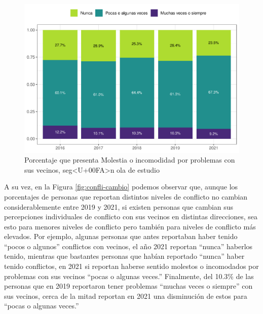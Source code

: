\documentclass[
  12pt,
]{book}
\begin{document}
\begin{figure}

{\centering \includegraphics{reporte-elsoc_files/figure-latex/confli-olas-1} 

}

\caption{Porcentaje que presenta Molestia o incomodidad por problemas con sus vecinos, seg<U+00FA>n ola de estudio }\label{fig:confli-olas}
\end{figure}

A su vez, en la Figura \ref{fig:confli-cambio} podemos observar que, aunque los porcentajes de personas que reportan distintos niveles de conflicto no cambian considerablemente entre 2019 y 2021, si existen personas que cambian sus percepciones individuales de conflicto con sus vecinos en distintas direcciones, sea esto para menores niveles de conflicto pero también para niveles de conflicto más elevados. Por ejemplo, algunas personas que antes reportaban haber tenido ``pocos o algunos'' conflictos con vecinos, el año 2021 reportan ``nunca'' haberlos tenido, mientras que bastantes personas que habían reportado ``nunca'' haber tenido conflictos, en 2021 si reportan haberse sentido molestos o incomodados por problemas con sus vecinos ``pocas o algunas veces.'' Finalmente, del 10.3\% de las personas que en 2019 reportaron tener problemas ``muchas veces o siempre'' con sus vecinos, cerca de la mitad reportan en 2021 una disminución de estos para ``pocas o algunas veces.''
\end{document}
